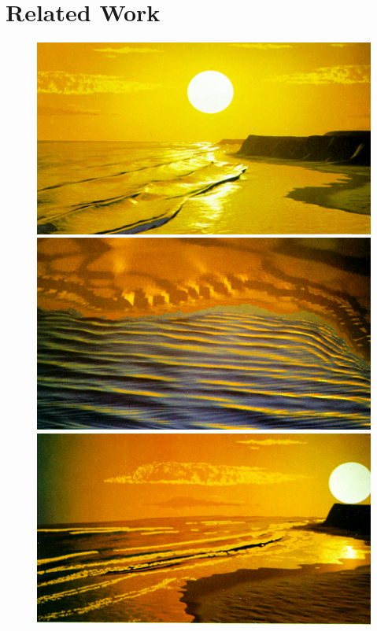 \chapter{Related Work}
\label{ch:state_of_the_art}




\begin{figure}
 \centering
 \subtop
 {
  \includegraphics[scale=0.25]{figures/A_Simple_Model_of_Ocean_Waves_-_Fournier_1986-008.png}
 }
 \hfill
 \subtop
 {
  \includegraphics[scale=0.25]{figures/A_Simple_Model_of_Ocean_Waves_-_Fournier_1986-010.png}
 }
 \subtop
 {
  \includegraphics[scale=0.25]{figures/A_Simple_Model_of_Ocean_Waves_-_Fournier_1986-011.png}
}
\end{figure}
